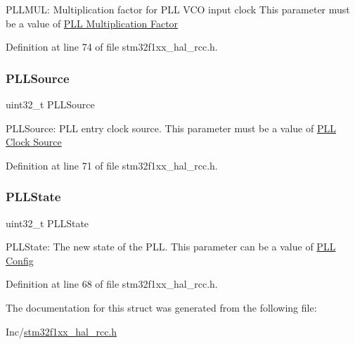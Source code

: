 P\+L\+L\+M\+UL\+: Multiplication factor for P\+LL V\+CO input clock This parameter must be a value of \hyperlink{group___r_c_c_ex___p_l_l___multiplication___factor}{P\+LL Multiplication Factor} 

Definition at line 74 of file stm32f1xx\+\_\+hal\+\_\+rcc.\+h.

\mbox{\label{struct_r_c_c___p_l_l_init_type_def_a418ecda4a355c6a161e4893a7bc1897f}} 
\subsubsection{\texorpdfstring{P\+L\+L\+Source}{PLLSource}}
{\footnotesize\ttfamily uint32\+\_\+t P\+L\+L\+Source}

P\+L\+L\+Source\+: P\+LL entry clock source. This parameter must be a value of \hyperlink{group___r_c_c___p_l_l___clock___source}{P\+LL Clock Source} 

Definition at line 71 of file stm32f1xx\+\_\+hal\+\_\+rcc.\+h.

\mbox{\label{struct_r_c_c___p_l_l_init_type_def_ab3bb33f461bb409576e1c899c962e0b0}} 
\subsubsection{\texorpdfstring{P\+L\+L\+State}{PLLState}}
{\footnotesize\ttfamily uint32\+\_\+t P\+L\+L\+State}

P\+L\+L\+State\+: The new state of the P\+LL. This parameter can be a value of \hyperlink{group___r_c_c___p_l_l___config}{P\+LL Config} 

Definition at line 68 of file stm32f1xx\+\_\+hal\+\_\+rcc.\+h.



The documentation for this struct was generated from the following file\+:\begin{DoxyCompactItemize}
\item 
Inc/\hyperlink{stm32f1xx__hal__rcc_8h}{stm32f1xx\+\_\+hal\+\_\+rcc.\+h}\end{DoxyCompactItemize}
